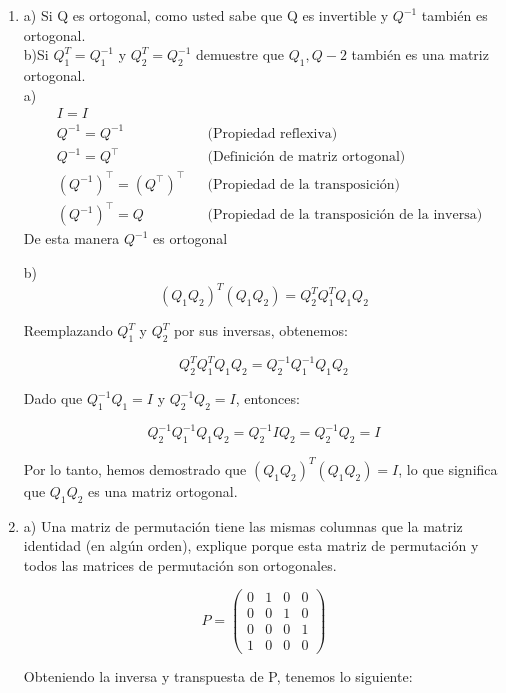 \documentclass{report}
\begin{document}
    \begin{enumerate}
        \item a) Si Q es  ortogonal, como usted sabe que Q es invertible y $Q^{-1}$ también es ortogonal. \\
        b)Si $Q_1^{T}=Q_1^{-1}$ y $Q_2^{T}=Q_2^{-1}$ demuestre que $Q_1,Q-2$ también es una matriz ortogonal.
        \\
        a) \begin{align*}
        &I = I  \\
        &Q^{-1}  = Q^{-1} & &\text{(Propiedad reflexiva)} \\
        &Q^{-1}  = Q^\top & &\text{(Definición de matriz ortogonal)} \\
        &(Q^{-1})^\top  = (Q^\top)^\top & &\text{(Propiedad de la transposición)} \\
        &(Q^{-1})^\top = Q & &\text{(Propiedad de la transposición de la inversa)}
        \end{align*}
        De esta manera $Q^{-1}$ es ortogonal
            
        b) \[(Q_1 Q_2)^T (Q_1 Q_2) = Q_2^T Q_1^T Q_1 Q_2\]
    
    Reemplazando \( Q_1^T \) y \( Q_2^T \) por sus inversas, obtenemos:
    
    \[
    Q_2^T Q_1^T Q_1 Q_2 = Q_2^{-1} Q_1^{-1} Q_1 Q_2
    \]
    
    Dado que \( Q_1^{-1} Q_1 = I \) y \( Q_2^{-1} Q_2 = I \), entonces:
    
    \[
    Q_2^{-1} Q_1^{-1} Q_1 Q_2 = Q_2^{-1} I Q_2 = Q_2^{-1} Q_2 = I
    \]
    
    Por lo tanto, hemos demostrado que \( (Q_1 Q_2)^T (Q_1 Q_2) = I \), lo que significa que \( Q_1 Q_2 \) es una matriz ortogonal.
    
    \item a) Una matriz de permutación tiene las mismas columnas que la matriz identidad (en algún orden), explique porque esta matriz de permutación  y todos las matrices de permutación son ortogonales.
    
    $$P=\begin{pmatrix}
        0 & 1 & 0 & 0\\
        0 & 0 & 1 & 0\\
        0 & 0 & 0 & 1\\
        1 & 0 & 0 & 0 
    \end{pmatrix}$$
    
    Obteniendo la inversa y transpuesta de P, tenemos lo siguiente:
    

\end{enumerate}
\end{document}
